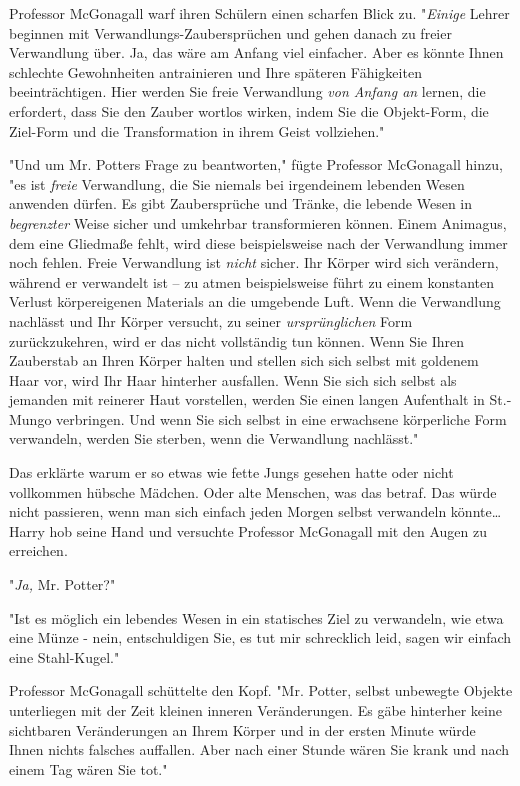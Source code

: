 {Professor McGonagall warf ihren Schülern einen scharfen Blick zu. "\emph{Einige} Lehrer beginnen mit Verwandlungs-Zaubersprüchen und gehen danach zu freier Verwandlung über. Ja, das wäre am Anfang viel einfacher. Aber es könnte Ihnen schlechte Gewohnheiten antrainieren und Ihre späteren Fähigkeiten beeinträchtigen. Hier werden Sie freie Verwandlung \emph{von Anfang an} lernen, die erfordert, dass Sie den Zauber wortlos wirken, indem Sie die Objekt-Form, die Ziel-Form und die Transformation in ihrem Geist vollziehen."

"Und um Mr. Potters Frage zu beantworten," fügte Professor McGonagall hinzu, "es ist \emph{freie} Verwandlung, die Sie niemals bei irgendeinem lebenden Wesen anwenden dürfen. Es gibt Zaubersprüche und Tränke, die lebende Wesen in \emph{begrenzter} Weise sicher und umkehrbar transformieren können. Einem Animagus, dem eine Gliedmaße fehlt, wird diese beispielsweise nach der Verwandlung immer noch fehlen. Freie Verwandlung ist \emph{nicht} sicher. Ihr Körper wird sich verändern, während er verwandelt ist -- zu atmen beispielsweise führt zu einem konstanten Verlust körpereigenen Materials an die umgebende Luft. Wenn die Verwandlung nachlässt und Ihr Körper versucht, zu seiner \emph{ursprünglichen} Form zurückzukehren, wird er das nicht vollständig tun können. Wenn Sie Ihren Zauberstab an Ihren Körper halten und stellen sich sich selbst mit goldenem Haar vor, wird Ihr Haar hinterher ausfallen. Wenn Sie sich sich selbst als jemanden mit reinerer Haut vorstellen, werden Sie einen langen Aufenthalt in St.-Mungo verbringen. Und wenn Sie sich selbst in eine erwachsene körperliche Form verwandeln, werden Sie sterben, wenn die Verwandlung nachlässt."

Das erklärte warum er so etwas wie fette Jungs gesehen hatte oder nicht vollkommen hübsche Mädchen. Oder alte Menschen, was das betraf. Das würde nicht passieren, wenn man sich einfach jeden Morgen selbst verwandeln könnte… Harry hob seine Hand und versuchte Professor McGonagall mit den Augen zu erreichen.

"\emph{Ja,} Mr. Potter?"

"Ist es möglich ein lebendes Wesen in ein statisches Ziel zu verwandeln, wie etwa eine Münze - nein, entschuldigen Sie, es tut mir schrecklich leid, sagen wir einfach eine Stahl-Kugel."

Professor McGonagall schüttelte den Kopf. "Mr. Potter, selbst unbewegte Objekte unterliegen mit der Zeit kleinen inneren Veränderungen. Es gäbe hinterher keine sichtbaren Veränderungen an Ihrem Körper und in der ersten Minute würde Ihnen nichts falsches auffallen. Aber nach einer Stunde wären Sie krank und nach einem Tag wären Sie tot."

}
